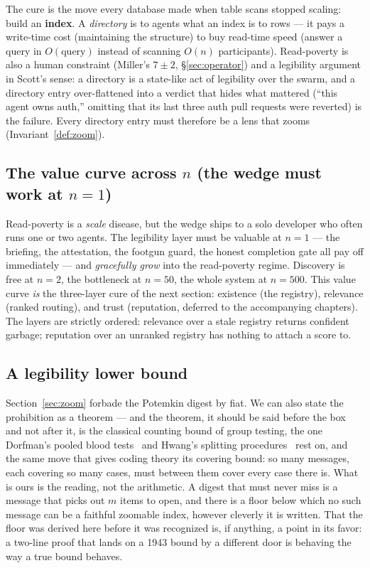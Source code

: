 \documentclass[11pt,a4paper]{article}
\theoremstyle{definition}
\theoremstyle{plain}
\begin{document}
The cure is the move every database made when table scans stopped scaling: build an
\textbf{index}. A \emph{directory} is to agents what an index is to rows --- it pays a
write-time cost (maintaining the structure) to buy read-time speed (answer a query in
$O(\text{query})$ instead of scanning $O(n)$ participants). Read-poverty is also a
human constraint (Miller's $7\pm2$, \S\ref{sec:operator}) and a legibility argument
in Scott's sense: a directory is a state-like act of legibility over the swarm, and a
directory entry over-flattened into a verdict that hides what mattered (``this agent
owns auth,'' omitting that its last three auth pull requests were reverted) is the
failure. Every directory entry must therefore be a lens that zooms
(Invariant~\ref{def:zoom}).

\ifdefined\pdswisslandmarkplate
\begin{figure}[p]
  \centering
\end{figure}
\fi

\subsection{The value curve across $n$ (the wedge must work at $n{=}1$)}\label{sec:value-curve}

Read-poverty is a \emph{scale} disease, but the wedge ships to a solo developer who
often runs one or two agents. The legibility layer must be valuable at $n{=}1$ ---
the briefing, the attestation, the footgun guard, the honest completion gate all pay
off immediately --- and \emph{gracefully grow} into the read-poverty regime.
Discovery is free at $n{=}2$, the
bottleneck at $n{=}50$, the whole system at $n{=}500$. This value curve \emph{is} the
three-layer cure of the next section: existence (the registry), relevance (ranked
routing), and trust (reputation, deferred to the accompanying chapters). The layers are
strictly ordered: relevance over a stale registry returns confident garbage;
reputation over an unranked registry has nothing to attach a score to.

\subsection{A legibility lower bound}\label{sec:lowerbound}

Section~\ref{sec:zoom} forbade the Potemkin digest by fiat. We can also state the
prohibition as a theorem --- and the theorem, it should be said before the box
and not after it, is the classical counting bound of group testing, the one
Dorfman's pooled blood tests~ and Hwang's splitting
procedures~ rest on, and the same move that gives coding theory
its covering bound: so many messages, each covering so many cases, must
between them cover every case there is. What is ours is the reading, not the
arithmetic. A digest that must never miss is a message that picks out $m$
items to open, and there is a floor below which no such message can be a
faithful zoomable index, however cleverly it is written. That the floor was
derived here before it was recognized is, if anything, a point in its favor:
a two-line proof that lands on a 1943 bound by a different door is behaving
the way a true bound behaves.
\end{document}
